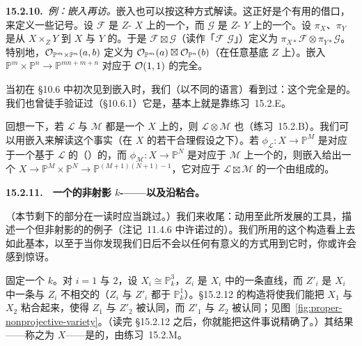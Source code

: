 \textbf{15.2.10.}\ \emph{例：\trSegre{}嵌入再访。}\quad \trSegre{}嵌入也可以按这种方式解读。这正好是个有用的借口，来定义一些记号。设 $\mathscr{F}$ 是 $Z$-\trScheme{} $X$ 上的一个\trQCSheaf，而 $\mathscr{G}$ 是 $Z$-\trScheme{} $Y$ 上的一个\trQCSheaf。设 $\pi_X$、$\pi_Y$ 是从 $X\times_Z Y$ 到 $X$ 与 $Y$ 的\trProjection。于是 $\mathscr{F}\boxtimes\mathscr{G}$（读作「$\mathscr{F}$ \trBoxProduct $\mathscr{G}$」）定义为 $\pi_{X*}\mathscr{F}\otimes\pi_{Y*}\mathscr{G}$。特别地，$\mathcal{O}_{\mathbb{P}^m\times\mathbb{P}^n}(a,b)$ 定义为 $\mathcal{O}_{\mathbb{P}^m}(a)\boxtimes\mathcal{O}_{\mathbb{P}^n}(b)$（在任意基底 $Z$ 上）。\trSegre{}嵌入 $\mathbb{P}^m\times\mathbb{P}^n\to\mathbb{P}^{mn+m+n}$ 对应于\trInvertibleSheaf{} $\mathcal{O}(1,1)$ 的完全\trLinearSystem。

当初在 \S10.6 中初次见到\trSegre{}嵌入时，我们（以不同的语言）看到过：这个完全\trLinearSystem{}是\trBasePointFree{}的。我们也曾徒手验证过（\S10.6.1）它是\trClosedEmbedding，基本上就是靠\mbox{练习~15.2.E}。

回想一下，若 $\mathscr{L}$ 与 $\mathscr{M}$ 都是一个\trScheme{} $X$ 上\trBasePointFree{}的\trInvertibleSheaf，则 $\mathscr{L}\otimes\mathscr{M}$ 也\trBasePointFree（\mbox{练习~15.2.B}）。我们可以用\trSegre{}嵌入来解读这个事实（在 $X$ 的若干合理假设之下）。若 $\phi_{\mathscr{L}}\colon X\to\mathbb{P}^M$ 是对应于一个基于 $\mathscr{L}$ 的（\trBasePointFree）\trLinearSystem{}的\trMorphism，而 $\phi_{\mathscr{M}}\colon X\to\mathbb{P}^N$ 是对应于 $\mathscr{M}$ 上一个\trLinearSystem{}的\trMorphism，则\trSegre{}嵌入给出一个\trMorphism{} $X\to\mathbb{P}^M\times\mathbb{P}^N\to\mathbb{P}^{(M+1)(N+1)-1}$，它对应于 $\mathscr{L}\boxtimes\mathscr{M}$ 的一个由\trSection{}组成的\trBasePointFree\trLinearSystem。

\textbf{15.2.11.}\ \extrahard\ \textbf{一个\trProper{}的非射影 $k$-\trVariety——以及沿\trClosedSubscheme{}粘合\trScheme。}

（本节剩下的部分在一读时应当跳过。）我们来收尾：动用至此所发展的工具，描述一个\trProper{}但非射影的\trScheme{}的例子（\mbox{注记~11.4.6} 中许诺过的）。我们所用的这个构造看上去如此基本，以至于当你发现我们日后不会以任何有意义的方式用到它时，你或许会感到惊讶。

固定一个\trAlgClosedField{} $k$。对 $i=1$ 与 $2$，设 $X_i\cong\mathbb{P}^3_k$，$Z_i$ 是 $X_i$ 中的一条直线，而 $Z'_i$ 是 $X_i$ 中一条与 $Z_i$ 不相交的\trRegular\trConic（$Z_i$ 与 $Z'_i$ 都\trIsomorphic{}于 $\mathbb{P}^1_k$）。\S15.2.12 的构造将使我们能把 $X_1$ 与 $X_2$ 粘合起来，使得 $Z_1$ 与 $Z'_2$ 被认同，而 $Z'_1$ 与 $Z_2$ 被认同；见图~\ref{fig:proper-nonprojective-variety}。（读完 \S15.2.12 之后，你就能把这件事说精确了。）其结果——称之为 $X$——是\trProper{}的，由\mbox{练习~15.2.M}。

